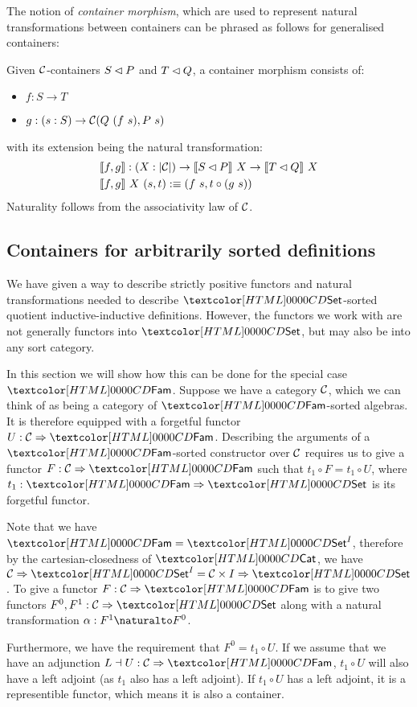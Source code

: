 The notion of \emph{container morphism}, which are used to represent
natural transformations between containers can be phrased as follows
for generalised containers:
\begin{definition}
  Given $\mathcal{C}$-containers $S \lhd P$ and $T \lhd Q$, a container
  morphism consists of:
  \begin{itemize}
  \item $f : S \to T$
  \item $g : (s : S) \to \Cc(Q\ (f\ s), P\ s)$
  \end{itemize}
  with its extension being the natural transformation:
  \begin{align*}
    &\llbracket f , g \rrbracket : (X : | \mathcal{C} |) \to \llbracket S \lhd P \rrbracket\ X \to \llbracket T \lhd Q \rrbracket\ X \\
    &\llbracket f , g \rrbracket\ X\ (s , t) :\equiv (f\ s , t \circ (g\ s))
  \end{align*}
  Naturality follows from the associativity law of $\mathcal{C}$.
\end{definition}

\subsection{Containers for arbitrarily sorted definitions}
We have given a way to describe strictly positive functors and natural
transformations needed to describe $\Set$-sorted quotient
inductive-inductive definitions. However, the functors we work with
are not generally functors into $\Set$, but may also be into any sort
category.

In this section we will show how this can be done for the special case
$\Fam$. Suppose we have a category $\mathcal{C}$, which we can think of as
being a category of $\Fam$-sorted algebras. It is therefore equipped
with a forgetful functor $U : \Func{\Cc}{\Fam}$. Describing the
arguments of a $\Fam$-sorted constructor over $\mathcal{C}$ requires us to
give a functor $F : \Func{\Cc}{\Fam}$ such that
$t_1 \circ F = t_1 \circ U$, where $t_1 : \Func{\Fam}{\Set}$ is its
forgetful functor.

Note that we have $\Fam = \Set^I$, therefore by the
cartesian-closedness of $\Cat$, we have
$\Func{\Cc}{\Set^I} = \Func{\Cc \times I}{\Set}$. To give a functor
$F : \Func{\Cc}{\Fam}$ is to give two functors
$F^0, F^1 : \Func{\Cc}{\Set}$ along with a natural transformation
$\alpha : \Nat{F^1}{F^0}$.

Furthermore, we have the requirement that $F^0 = t_1 \circ U$. If we
assume that we have an adjunction $L \dashv U : \Func{\Cc}{\Fam}$,
$t_1 \circ U$ will also have a left adjoint (as $t_1$ also has a left
adjoint). If $t_1 \circ U$ has a left adjoint, it is a representible
functor, which means it is also a container.

